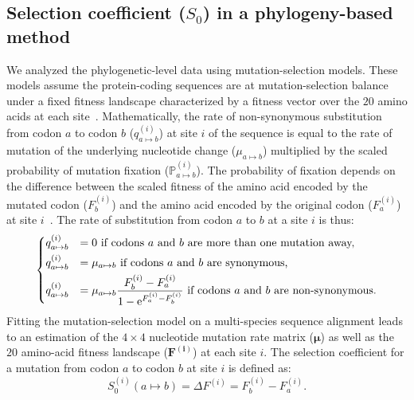 \documentclass{article}
\newcommand{\UniDimArray}[1]{\bm{#1}}
\newcommand{\e}{\text{e}}
\newcommand{\proba}{\mathbb{P}}
\newcommand{\Sphy}{S_{0}}
\begin{document}
    \subsection{Selection coefficient ($\Sphy$) in a phylogeny-based method}
    \label{subsec:s-phylogeny-method}
    We analyzed the phylogenetic-level data using mutation-selection models.
    These models assume the protein-coding sequences are at mutation-selection balance under a fixed fitness landscape characterized by a fitness vector over the $20$ amino acids at each site~\cite{yang_mutationselection_2008, halpern_evolutionary_1998, rodrigue_mechanistic_2010}.
    Mathematically, the rate of non-synonymous substitution from codon $a$ to codon $b$ ($q_{a \mapsto b}^{(i)}$) at site $i$ of the sequence is equal to the rate of mutation of the underlying nucleotide change ($\mu_{a \mapsto b}$) multiplied by the scaled probability of mutation fixation ($\proba_{a \mapsto b}^{(i)}$).
    The probability of fixation depends on the difference between the scaled fitness of the amino acid encoded by the mutated codon ($F_b^{(i)}$) and the amino acid encoded by the original codon ($F_a^{(i)}$) at site $i$~\cite{wright_evolution_1931, fisher_genetical_1930}.
    The rate of substitution from codon $a$ to $b$ at a site $i$ is thus:
    \begin{equation}
        \begin{dcases}
            q_{a \mapsto b}^{(i)} & = 0 \text{ if codons $a$ and $b$ are more than one mutation away,} \\
            q_{a \mapsto b}^{(i)} & = \mu_{a \mapsto b} \text{ if codons $a$ and $b$ are synonymous,} \\
            q_{a \mapsto b}^{(i)} & = \mu_{a \mapsto b} \dfrac{F_b^{(i)} - F_a^{(i)}}{1 - \e^{F_a^{(i)} - F_b^{(i)}}} \text{ if codons $a$ and $b$ are non-synonymous}.
        \end{dcases}
    \end{equation}
    Fitting the mutation-selection model on a multi-species sequence alignment leads to an estimation of the $4 \times 4$ nucleotide mutation rate matrix ($\UniDimArray{\mu}$) as well as the $20$ amino-acid fitness landscape ($\UniDimArray{F^{(i)}}$) at each site $i$.
    The selection coefficient for a mutation from codon $a$ to codon $b$ at site $i$ is defined as:
    \begin{equation}
        \Sphy^{(i)} (a \mapsto b) = \Delta F^{(i)} = F^{(i)}_{b} - F^{(i)}_{a}.
    \end{equation}
\end{document}
